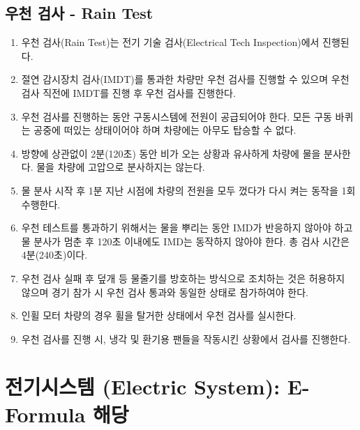 \documentclass[final,a4paper,10pt]{report}
\begin{document}
\section{우천 검사 - Rain Test}\label{rule:formula-technical.rain-test}
\begin{enumerate}
  \item\label{rule:formula-technical.rain-test.performed-during-tech-inspection} 우천 검사(Rain Test)는 전기 기술 검사(Electrical Tech Inspection)에서 진행된다.
  \item\label{rule:formula-technical.rain-test.requires-imdt-immediately-before} 절연 감시장치 검사(IMDT)를 통과한 차량만 우천 검사를 진행할 수 있으며 우천 검사 직전에 IMDT를 진행 후 우천 검사를 진행한다.
  \item\label{rule:formula-technical.rain-test.ts-powered-wheels-elevated} 우천 검사를 진행하는 동안 구동시스템에 전원이 공급되어야 한다. 모든 구동 바퀴는 공중에 떠있는 상태이어야 하며 차량에는 아무도 탑승할 수 없다.
  \item\label{rule:formula-technical.rain-test.spray-duration-120s} 방향에 상관없이 2분(120초) 동안 비가 오는 상황과 유사하게 차량에 물을 분사한다. 물을 차량에 고압으로 분사하지는 않는다.
  \item\label{rule:formula-technical.rain-test.power-cycle-at-60s} 물 분사 시작 후 1분 지난 시점에 차량의 전원을 모두 껐다가 다시 켜는 동작을 1회 수행한다.
  \item\label{rule:formula-technical.rain-test.no-trip-pass-criteria} 우천 테스트를 통과하기 위해서는 물을 뿌리는 동안 IMD가 반응하지 않아야 하고 물 분사가 멈춘 후 120초 이내에도 IMD는 동작하지 않아야 한다. 총 검사 시간은 4분(240초)이다.
  \item\label{rule:formula-technical.rain-test.shielding-workaround-banned} 우천 검사 실패 후 덮개 등 물줄기를 방호하는 방식으로 조치하는 것은 허용하지 않으며 경기 참가 시 우천 검사 통과와 동일한 상태로 참가하여야 한다.
  \item\label{rule:formula-technical.rain-test.inwheel-motor-wheel-removal} 인휠 모터 차량의 경우 휠을 탈거한 상태에서 우천 검사를 실시한다.
  \item\label{rule:formula-technical.rain-test.cooling-fans-running} {\color{blue} 우천 검사를 진행 시, 냉각 및 환기용 팬들을 작동시킨 상황에서 검사를 진행한다.}
\end{enumerate}

\chapter{전기시스템 (Electric System): E-Formula 해당}
\end{document}
